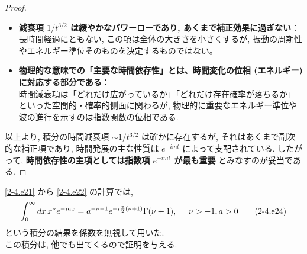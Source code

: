 \documentclass[a4paper,12pt]{article}
\begin{document}
\begin{proof}
\begin{itemize}
  \item \textbf{減衰項 $1/t^{3/2}$ は緩やかなパワーローであり, あくまで補正効果に過ぎない}：\\
  長時間経過にともない, この項は全体の大きさを小さくするが, 振動の周期性やエネルギー準位そのものを決定するものではない。

  \item \textbf{物理的な意味での「主要な時間依存性」とは、時間変化の位相 (エネルギー) に対応する部分である}：\\
  時間減衰項は「どれだけ広がっているか」「どれだけ存在確率が落ちるか」といった空間的・確率的側面に関わるが, 物理的に重要なエネルギー準位や波の進行を示すのは指数関数の位相である.
\end{itemize}

以上より, 積分の時間減衰項 $\sim 1/t^{3/2}$ は確かに存在するが, それはあくまで副次的な補正項であり, 時間発展の主な性質は $e^{-imt}$ によって支配されている. したがって, \textbf{時間依存性の主項としては指数項 $e^{-imt}$ が最も重要} とみなすのが妥当である.

\end{proof}
\eqref{2-4.e21} から \eqref{2-4.e22} の計算では,
\begin{equation*}
  \int_{0}^{\infty} dx\, x^{\nu} e^{-iax} = a^{-\nu-1} e^{-i\frac{\pi}{2} (\nu + 1)} \Gamma(\nu+1), \hspace{0.5cm} \nu > -1, a > 0 \label{2-4.e24}\tag{2-4.e24}
\end{equation*}
という積分の結果を係数を無視して用いた.\\ この積分は, 他でも出てくるので証明を与える.
\end{document}
